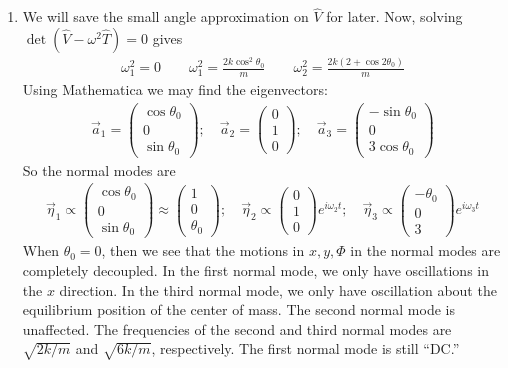 \documentclass{article}
\theoremstyle{definition}
\newcommand{\f}[2]{\frac{#1}{#2}}
\begin{document}
\begin{enumerate}[label=(\alph*)]
	
	\item We will save the small angle approximation on $\hat{V}$ for later. Now, solving $\det(\hat{V} - \omega^2 \hat{T}) = 0$ gives
	\begin{align*}
	{\omega_1^2 = 0 \quad\quad \omega_1^2 = \f{2k\cos^2\theta_0}{m} \quad\quad \omega_2^2 = \f{2k(2+\cos2\theta_0)}{m}}
	\end{align*}
	Using Mathematica we may find the eigenvectors:
	\begin{align*}
	\vec{a}_1 = \begin{pmatrix}
	\cos\theta_0 \\ 0 \\ \sin\theta_0
	\end{pmatrix};
	\quad 
	\vec{a}_2 = \begin{pmatrix}
	0 \\ 1 \\ 0
	\end{pmatrix}; \quad
	\vec{a}_3 = \begin{pmatrix}
	-\sin\theta_0 \\ 0 \\ 3\cos\theta_0
	\end{pmatrix}
	\end{align*}
	So the normal modes are 
	\begin{align*}
	\boxed{\vec{\eta}_1 \propto \begin{pmatrix}
	\cos\theta_0 \\ 0 \\ \sin\theta_0
	\end{pmatrix}\approx \begin{pmatrix}
	1 \\ 0 \\ \theta_0
	\end{pmatrix}; \quad
	\vec{\eta}_2 \propto \begin{pmatrix}
	0 \\ 1 \\ 0
	\end{pmatrix} e^{i\omega_2 t}; \quad 
	\vec{\eta}_3 \propto \begin{pmatrix}
	-\theta_0 \\ 0 \\ 3
	\end{pmatrix}e^{i\omega_3 t}}
	\end{align*}
	When $\theta_0 = 0$, then we see that the motions in $x,y,\Phi$ in the normal modes are completely decoupled. In the first normal mode, we only have oscillations in the $x$ direction. In the third normal mode, we only have oscillation about the equilibrium position of the center of mass. The second normal mode is unaffected. The frequencies of the second and third normal modes are $\sqrt{2k/m}$ and $\sqrt{6k/m}$, respectively. The first normal mode is still ``DC.''	
	\newpage
	

\end{enumerate}
\end{document}
